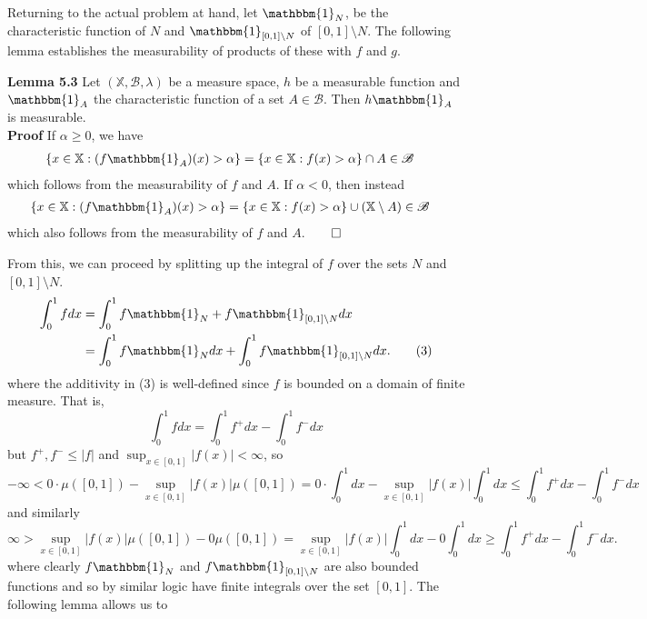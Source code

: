 \documentclass[11pt, letterpaper]{article}
\newcommand{\mbb}[1]{\mathbb{#1}}
\newcommand{\bbm}[1]{\mathbbm{#1}}
\newcommand{\mc}[1]{\mathcal{#1}}
\begin{document}
    Returning to the actual problem at hand, let $\bbm{1}_N$, be the characteristic function of $N$ and $\bbm{1}_{[0,1]\setminus N}$ of $[0,1]\setminus N$. The following lemma establishes the measurability of products of these with $f$ and $g$. 
    \begin{center}
        \begin{minipage}[c]{0.85\linewidth}
            {\bf Lemma 5.3} Let $(\mbb{X},\mc{B},\lambda)$ be a measure space, $h$ be a measurable function and $\bbm{1}_A$ the characteristic function of a set $A\in\mc{B}$. Then $h\bbm{1}_A$ is measurable.\\[10pt]
            {\bf Proof} If $\alpha\geq 0$, we have 
            \begin{align*}
                \{x\in\mbb{X}:(f\bbm{1}_A)(x)>\alpha\}&=
                    \{x\in\mbb{X}:f(x)>\alpha\}\cap A\in\mc{B}
            \end{align*}
            which follows from the measurability of $f$ and $A$. If $\alpha<0$, then instead
            \begin{align*}
                \{x\in\mbb{X}:(f\bbm{1}_A)(x)>\alpha\}&=
                    \{x\in\mbb{X}:f(x)>\alpha\}\cup (\mbb{X}\setminus A)\in\mc{B}
            \end{align*}
            which also follows from the measurability of $f$ and $A$.\hfill{$\qed$}
        \end{minipage}
    \end{center}\vspace{10pt}
    From this, we can proceed by splitting up the integral of $f$ over the sets $N$ and $[0,1]\setminus N$.
    \begin{align*}
        \int_0^1fdx&=\int_0^1f\bbm{1}_N+f\bbm{1}_{[0,1]\setminus N}dx\\
        &=\int_0^1f\bbm{1}_Ndx+\int_0^1 f\bbm{1}_{[0,1]\setminus N}dx.\tag{3}
    \end{align*}
    where the additivity in (3) is well-defined since $f$ is bounded on a domain of finite measure. That is, 
    \[\int_0^1fdx=\int_0^1f^+dx-\int_0^1f^-dx\]
    but $f^+,f^- \leq |f|$ and $\sup_{x\in[0,1]}|f(x)|<\infty$, so
    \[-\infty<0\cdot\mu([0,1])-\sup_{x\in[0,1]}|f(x)|\mu([0,1])=0\cdot\int_0^1dx-\sup_{x\in[0,1]}|f(x)|\int_0^1dx\leq \int_0^1f^+dx-\int_0^1f^-dx\]
    and similarly
    \[\infty>\sup_{x\in[0,1]}|f(x)|\mu([0,1])-0\mu([0,1])=\sup_{x\in[0,1]}|f(x)|\int_0^1dx-0\int_0^1dx\geq \int_0^1f^+dx-\int_0^1f^-dx.\]
    where clearly $f\bbm{1}_N$ and $f\bbm{1}_{[0,1]\setminus N}$ are also bounded functions and so by similar logic have finite integrals over the set $[0,1]$. The following lemma allows us to
\end{document}
